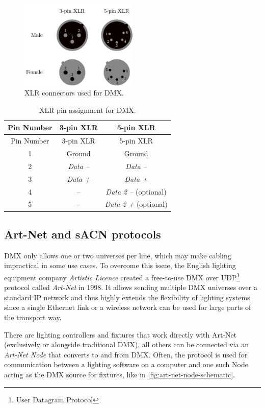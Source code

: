 \begin{figure}
\centering
\includegraphics[width=0.50000\textwidth]{Bilder/xlr-connectors.pdf}
\caption[XLR connectors used for DMX]{XLR connectors used for DMX.}\label{fig:xlr-connectors}
\end{figure}

\hypertarget{tbl:xlr-pins}{}
\begin{longtable}[]{@{}ccc@{}}
\caption[XLR pin assignment for DMX]{\label{tbl:xlr-pins}XLR pin assignment for DMX.
}\tabularnewline
\toprule
Pin Number & 3-pin XLR & 5-pin XLR\tabularnewline
\midrule
\endfirsthead
\toprule
Pin Number & 3-pin XLR & 5-pin XLR\tabularnewline
\midrule
\endhead
1 & Ground & Ground\tabularnewline
2 & \emph{Data --} & \emph{Data --}\tabularnewline
3 & \emph{Data +} & \emph{Data +}\tabularnewline
4 & -- & \emph{Data 2 --} (optional)\tabularnewline
5 & -- & \emph{Data 2 +} (optional)\tabularnewline
\bottomrule
\end{longtable}

\hypertarget{sec:art-net-sacn}{\subsection{Art-Net and sACN
protocols}\label{sec:art-net-sacn}}

DMX only allows one or two universes per line, which may make cabling
impractical in some use cases. To overcome this issue, the English
lighting equipment company \emph{Artistic Licence} created a free-to-use
DMX over UDP\footnote{User Datagram Protocol} protocol called
\emph{Art-Net} \citep{artistic-licence-art-net4} in 1998. It allows
sending multiple DMX universes over a standard IP network and thus
highly extends the flexibility of lighting systems since a single
Ethernet link or a wireless network can be used for large parts of the
transport way.

There are lighting controllers and fixtures that work directly with
Art-Net (exclusively or alongside traditional DMX), all others can be
connected via an \emph{Art-Net Node} that converts to and from DMX.
Often, the protocol is used for communication between a lighting
software on a computer and one such Node acting as the DMX source for
fixtures, like in \cref{fig:art-net-node-schematic}.

